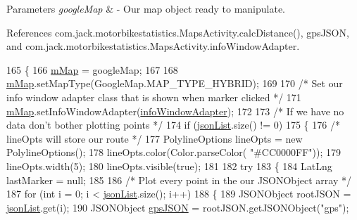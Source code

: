 \begin{DoxyParams}{Parameters}
{\em google\+Map} & -\/ Our map object ready to manipulate. \\
\hline
\end{DoxyParams}


References com.\+jack.\+motorbikestatistics.\+Maps\+Activity.\+calc\+Distance(), gps\+J\+S\+ON, and com.\+jack.\+motorbikestatistics.\+Maps\+Activity.\+info\+Window\+Adapter.


\begin{DoxyCode}
165                                                 \{
166         \hyperlink{classcom_1_1jack_1_1motorbikestatistics_1_1_maps_activity_aaace5219464acf3df9ac5e9ce913eef5}{mMap} = googleMap;
167 
168         \hyperlink{classcom_1_1jack_1_1motorbikestatistics_1_1_maps_activity_aaace5219464acf3df9ac5e9ce913eef5}{mMap}.setMapType(GoogleMap.MAP\_TYPE\_HYBRID);
169 
170         \textcolor{comment}{/* Set our info window adapter class that is shown when marker clicked */}
171         \hyperlink{classcom_1_1jack_1_1motorbikestatistics_1_1_maps_activity_aaace5219464acf3df9ac5e9ce913eef5}{mMap}.setInfoWindowAdapter(\hyperlink{classcom_1_1jack_1_1motorbikestatistics_1_1_maps_activity_ae1d8944364b8deb189ee2c40471616b5}{infoWindowAdapter});
172 
173         \textcolor{comment}{/* If we have no data don't bother plotting points */}
174         \textcolor{keywordflow}{if} (\hyperlink{classcom_1_1jack_1_1motorbikestatistics_1_1_maps_activity_aaed26c36e08dad942830ab52d9d75d2e}{jsonList}.size() != 0)
175         \{
176             \textcolor{comment}{/* lineOpts will store our route */}
177             PolylineOptions lineOpts = \textcolor{keyword}{new} PolylineOptions();
178             lineOpts.color(Color.parseColor( \textcolor{stringliteral}{"#CC0000FF"}));
179             lineOpts.width(5);
180             lineOpts.visible(\textcolor{keyword}{true});
181 
182             \textcolor{keywordflow}{try}
183             \{
184                 LatLng lastMarker = null;
185 
186                 \textcolor{comment}{/* Plot every point in the our JSONObject array */}
187                 \textcolor{keywordflow}{for} (\textcolor{keywordtype}{int} i = 0; i < \hyperlink{classcom_1_1jack_1_1motorbikestatistics_1_1_maps_activity_aaed26c36e08dad942830ab52d9d75d2e}{jsonList}.size(); i++)
188                 \{
189                     JSONObject rootJSON = \hyperlink{classcom_1_1jack_1_1motorbikestatistics_1_1_maps_activity_aaed26c36e08dad942830ab52d9d75d2e}{jsonList}.get(i);
190                     JSONObject \hyperlink{logging-device_8ino_a548727e041a5cd3db91bdbd0ccd71e30}{gpsJSON} = rootJSON.getJSONObject(\textcolor{stringliteral}{"gps"});

\end{DoxyCode}
